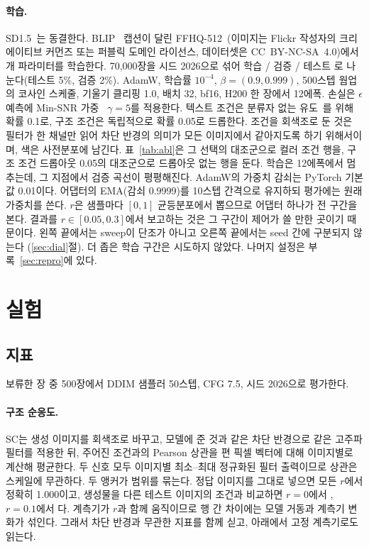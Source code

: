 \documentclass[10pt,twocolumn,a4paper]{article}
\begin{document}
\paragraph{학습.} SD1.5~\cite{rombach2021high}는 동결한다. BLIP~\cite{li2022blip} 캡션이
달린 FFHQ-512~\cite{karras2018style}(이미지는 Flickr 작성자의 크리에이티브 커먼즈 또는
퍼블릭 도메인 라이선스, 데이터셋은 CC~BY-NC-SA~4.0)에서 \ourParams{}개 파라미터를 학습한다.
70,000장을 시드 2026으로 섞어 학습 \nTrain{} / 검증 \nValid{} / 테스트 \nTest{}로
나눈다(테스트 5\%, 검증 2\%). AdamW, 학습률 $10^{-4}$, $\beta=(0.9,0.999)$, 500스텝 웜업의
코사인 스케줄, 기울기 클리핑 1.0, 배치 32, bf16, H200 한 장에서 12에폭. 손실은 $\epsilon$
예측에 Min-SNR 가중~\cite{hang2023efficient} $\gamma=5$를 적용한다. 텍스트 조건은 분류자
없는 유도~\cite{ho2022classifier}를 위해 확률 0.1로, 구조 조건은 독립적으로 확률 0.05로
드롭한다. 조건을 회색조로 둔 것은 필터가 한 채널만 읽어 차단 반경의 의미가 모든 이미지에서
같아지도록 하기 위해서이며, 색은 사전분포에 남긴다. 표~\ref{tab:abl}은 그 선택의 대조군으로
컬러 조건 행을, 구조 조건 드롭아웃 0.05의 대조군으로 드롭아웃 없는 행을 둔다. 학습은
12에폭에서 멈추는데, 그 지점에서 검증 곡선이 평평해진다. AdamW의 가중치 감쇠는 PyTorch
기본값 0.01이다. 어댑터의 EMA(감쇠 0.9999)를 10스텝 간격으로 유지하되 평가에는 원래
가중치를 쓴다. $r$은 샘플마다 $[0,1]$ 균등분포에서 뽑으므로 어댑터 하나가 전 구간을 본다.
결과를 $r \in [0.05, 0.3]$에서 보고하는 것은 그 구간이 제어가 쓸 만한 곳이기 때문이다.
왼쪽 끝에서는 sweep이 단조가 아니고 오른쪽 끝에서는 seed 간에 구분되지 않는다
(\ref{sec:dial}절). 더 좁은 학습 구간은 시도하지 않았다. 나머지 설정은
부록~\ref{sec:repro}에 있다.

\section{실험}

\subsection{지표}
\label{sec:metrics}

보류한 \nTest{}장 중 500장에서 DDIM 샘플러 50스텝, CFG 7.5, 시드 2026으로 평가한다.

\paragraph{구조 순응도.} SC는 생성 이미지를 회색조로 바꾸고, 모델에 준 것과 같은 차단
반경으로 같은 고주파 필터를 적용한 뒤, 주어진 조건과의 Pearson
상관을 편 픽셀 벡터에 대해 이미지별로 계산해 평균한다. 두 신호 모두 이미지별 최소--최대
정규화된 필터 출력이므로 상관은 스케일에 무관하다. 두 앵커가 범위를 묶는다. 정답 이미지를
그대로 넣으면 모든 $r$에서 정확히 1.000이고, 생성물을 다른 테스트 이미지의 조건과 비교하면
$r{=}0$에서 \scFloorZero{}, $r{=}0.1$에서 \scFloorOneZero{}다. 계측기가 $r$과 함께
움직이므로 행 간 차이에는 모델 거동과 계측기 변화가 섞인다. 그래서 차단 반경과 무관한 지표를
함께 싣고, 아래에서 고정 계측기로도 읽는다.
\end{document}
